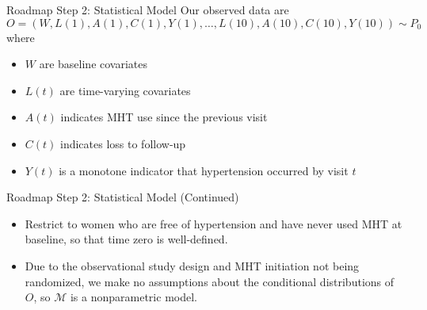 \documentclass[11pt, xcolor={dvipsnames}, usepdftitle=false]{beamer}
\begin{document}
\begin{frame}{Roadmap Step 2: Statistical Model}
Our observed data are
\[O = (W, L(1), A(1), C(1), Y(1), \dots, L(10), A(10), C(10), Y(10)) \sim P_0\]
where 

\begin{itemize}
    \item $W$ are baseline covariates
    \item $L(t)$ are time-varying covariates
    \item $A(t)$ indicates MHT use since the previous visit \footnotemark
    \item $C(t)$ indicates loss to follow-up
    \item $Y(t)$ is a monotone indicator that hypertension occurred by visit $t$
\end{itemize}

\end{frame}

\begin{frame}{Roadmap Step 2: Statistical Model (Continued)}
\begin{itemize}
    \item Restrict to women who are free of hypertension and have never used MHT at baseline, so that time zero is well-defined.
    \item Due to the observational study design and MHT initiation not being randomized, we make no assumptions about the conditional distributions of $O$, so $\mathcal M$ is a nonparametric model.
\end{itemize}
\end{frame}
\end{document}
